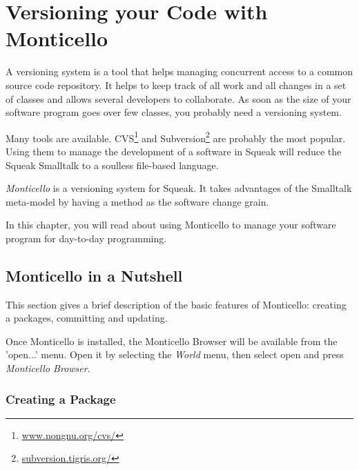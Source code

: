 \documentclass[a4paper,10pt,twoside]{book}
\begin{document}
	\renewcommand{\nnbb}[2]{} %
	\sloppy
\fi
\chapter{Versioning your Code with Monticello}

A versioning system is a tool that helps managing concurrent access to a common source code repository. It helps to keep track of all work and all changes in a set of classes and allows several developers to collaborate. As soon as the size of your software program goes over few classes, you probably need a versioning system.

Many tools are available. CVS\footnote{\href{http://www.nongnu.org/cvs/}{www.nongnu.org/cvs/}} and Subversion\footnote{\href{http://subversion.tigris.org/}{subversion.tigris.org/}} are probably the most popular. Using them to manage the development of a software in Squeak will reduce the Squeak Smalltalk to a soulless file-based language. 

\emph{Monticello} is a versioning system for Squeak. It takes advantages of the Smalltalk meta-model by having a method as the software change grain. 

In this chapter, you will read about using Monticello to manage your software program for day-to-day programming.


\section{Monticello in a Nutshell}

This section gives a brief description of the basic features of Monticello: creating a packages, committing and updating.

Once Monticello is installed, the Monticello Browser will be available from the 'open...' menu. Open it by selecting the \emph{World} menu, then select open and press \emph{Monticello Browser}.



\subsection{Creating a Package}
\end{document}
